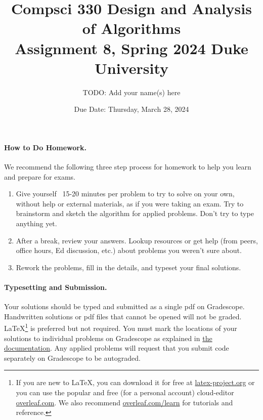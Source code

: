 \documentclass[11pt]{article}
\title{\vspace{-0.5in}Compsci 330 Design and Analysis of Algorithms \\Assignment 8, Spring 2024 Duke University}
\author{TODO: Add your name(s) here}
\date{Due Date: Thursday, March 28, 2024}
\begin{document}
\maketitle


\paragraph{How to Do Homework.} We recommend the following three step process for homework to help you learn and prepare for exams.
\begin{enumerate}
	\item Give yourself ~15-20 minutes per problem to try to solve on your own, without help or external materials, as if you were taking an exam. Try to brainstorm and sketch the algorithm for applied problems. Don't try to type anything yet.
	\item After a break, review your answers. Lookup resources or get help (from peers, office hours, Ed discussion, etc.) about problems you weren't sure about.
	\item Rework the problems, fill in the details, and typeset your final solutions.
\end{enumerate}

\paragraph{Typesetting and Submission.} Your solutions should be typed and submitted as a single pdf on Gradescope. Handwritten solutions or pdf files that cannot be opened will not be graded. \LaTeX \footnote{If you are new to \LaTeX, you can download it for free at \href{https://www.latex-project.org}{latex-project.org} or you can use the popular and free (for a personal account) cloud-editor \href{https://www.overleaf.com}{overleaf.com}. We also recommend \href{https://www.overleaf.com/learn}{overleaf.com/learn} for tutorials and reference.} is preferred but not required. %
You must mark the locations of your solutions to individual problems on Gradescope as explained in \href{https://help.gradescope.com/article/ccbpppziu9-student-submit-work#submitting_a_pdf}{the documentation}. Any applied problems will request that you submit code separately on Gradescope to be autograded. 
\end{document}

